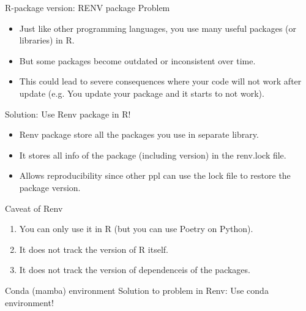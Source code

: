 \documentclass[10pt]{beamer}
\begin{document}
\begin{frame}{R-package version: RENV package}
	Problem
	\begin{itemize}
		\item Just like other programming languages, you use many useful packages (or libraries) in R.
		\item But some packages become outdated or inconsistent over time.
		\item This could lead to severe consequences where your code will not work after update (e.g. You update your package and it starts to not work).
	\end{itemize}\vspace{5mm}

	Solution: Use Renv package in R!
	\begin{itemize}
		\item Renv package store all the packages you use in separate library.
		\item It stores all info of the package (including version) in the renv.lock file.
		\item Allows reproducibility since other ppl can use the lock file to restore the package version.
	\end{itemize}
\end{frame}

\begin{frame}{Caveat of Renv}
	\begin{enumerate}
		\item You can only use it in R (but you can use Poetry on Python).
		\item It does not track the version of R itself.
		\item It does not track the version of dependenceis of the packages.
	\end{enumerate}
\end{frame}

\begin{frame}{Conda (mamba) environment}
Solution to problem in Renv: Use conda environment!

\end{frame}
\end{document}
